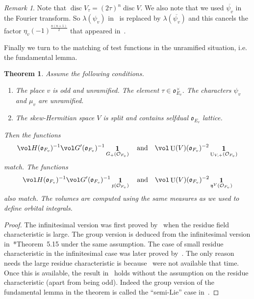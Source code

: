 \documentclass[letterpaper,11pt]{amsart}
\newcommand{\fo}{\mathfrak{o}}
\newcommand{\fx}{\mathfrak{x}}
\newcommand{\fy}{\mathfrak{y}}
\newcommand{\cO}{\mathcal{O}}
\newcommand{\<}{\negthickspace}
\DeclareMathOperator{\U}{U}
\DeclareMathOperator{\id}{\mathbf{1}}
\DeclareMathOperator{\disc}{disc}
\theoremstyle{definition}
\theoremstyle{plain}
\newtheorem{theorem}[definition]{Theorem}
\theoremstyle{remark}
\newtheorem{remark}[definition]{Remark}
\numberwithin{equation}{section}
\begin{document}
\begin{remark}
Note that $\disc V_{\tau} = (2\tau)^n \disc V$. We also note that we used
$\overline{\psi_v}$ in the Fourier transform. So $\lambda(\psi_v)$
in~\cite{BP1} is replaced by $\lambda(\overline{\psi_v})$ and this cancels
the factor $\eta_v(-1)^{\frac{n(n+1)}{2}}$ that appeared in~\cites{BP1}.
\end{remark}

Finally we turn to the matching of test functions in the unramified
situation, i.e. the fundamental lemma.

\begin{theorem} \label{thm:FL}
Assume the following conditions.
\begin{enumerate}
\item The place $v$ is odd and unramified. The element $\tau \in
    \fo_{E_v}^\times$. The characters $\psi_v$ and $\mu_v$ are unramified.

\item The skew-Hermitian space $V$ is split and contains selfdual
    $\fo_{E_v}$ lattice.
\end{enumerate}
Then the functions
    \[
    \vol H(\fo_{F_v})^{-1} \vol G'(\fo_{F_v})^{-1} \id_{G_+(\cO_{F_v})}
    \quad \text{and} \quad
    \vol \U(V)(\fo_{F_v})^{-2} \id_{\U_{V, +}(\cO_{F_v})}
    \]
match. The functions
    \[
    \vol H(\fo_{F_v})^{-1} \vol G'(\fo_{F_v})^{-1} \id_{\fx(\cO_{F_v})}
    \quad \text{and} \quad
    \vol \U(V)(\fo_{F_v})^{-2} \id_{\fy^V(\cO_{F_v})}
    \]
also match. The volumes are computed using the same measures as we used to define orbital integrals.
\end{theorem}

\begin{proof}
The infinitesimal version was first proved by~\cite{Yun} when the residue
field characteristic is large. The group version is deduced from the
infinitesimal version in~\cite{Liu}*{Theorem~5.15} under the same assumption.
The case of small residue characteristic in the infinitesimal case was later
proved by~\cites{BP3,Zhang3}. The only reason~\cite{Liu} needs the large
residue characteristic is because~\cites{BP3,Zhang3} were not available that
time. Once this is available, the result in~\cite{Liu} holds without the
assumption on the residue characteristic (apart from being odd). Indeed the
group version of the fundamental lemma in the theorem is called the
``semi-Lie'' case in~\cite{Zhang3}.
\end{proof}
\end{document}
